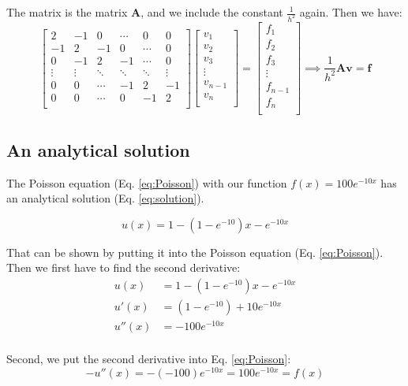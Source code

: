 The matrix is the matrix $\textbf{A}$, and we include the constant $\frac{1}{h^2}$ again. Then we have:
\[
    \begin{bmatrix}
    	2& -1& 0 &\cdots & 0 &0 \\
        -1 & 2 & -1 &0 &\cdots &0 \\
        0&-1 &2 & -1 & \cdots & 0 \\
        \vdots& \vdots & \ddots &\ddots &\ddots & \vdots \\
        0&0 & \cdots &-1 &2& -1 \\
        0&0 & \cdots & 0  &-1 & 2 \\
        \end{bmatrix}
\begin{bmatrix}
	v_1\\
	v_2\\
	v_3\\
	\vdots\\
	v_{n-1}\\
	v_{n}\\
\end{bmatrix}=
\begin{bmatrix}
	f_1\\
	f_2\\
	f_3\\
	\vdots\\
	f_{n-1}\\
	f_{n}\\
\end{bmatrix}
\implies \frac{1}{h^2}\mathbf{A}\mathbf{v}=\mathbf{f}
\]

\subsection{An analytical solution}

The Poisson equation (Eq. \ref{eq:Poisson}) with our function $f(x) = 100e^{-10x}$ has an analytical solution (Eq. \ref{eq:solution}).

\begin{equation}\label{eq:solution}
u(x) = 1 - \left(1-e^{-10}\right)x - e^{-10x}
\end{equation}

That can be shown by putting it into the Poisson equation (Eq. \ref{eq:Poisson}). Then we first have to find the second derivative:
\begin{align*}
u(x) &= 1 - \left(1-e^{-10}\right) x - e^{-10x}\\
u'(x) &= \left(1-e^{-10}\right)+ 10 e^{-10x}\\ 
u''(x) &= -100 e^{-10x}\\
\end{align*}

Second, we put the second derivative into Eq. \ref{eq:Poisson}:
\[ -u''(x) = -(-100) e^{-10x} = 100 e^{-10x} = f(x) \]